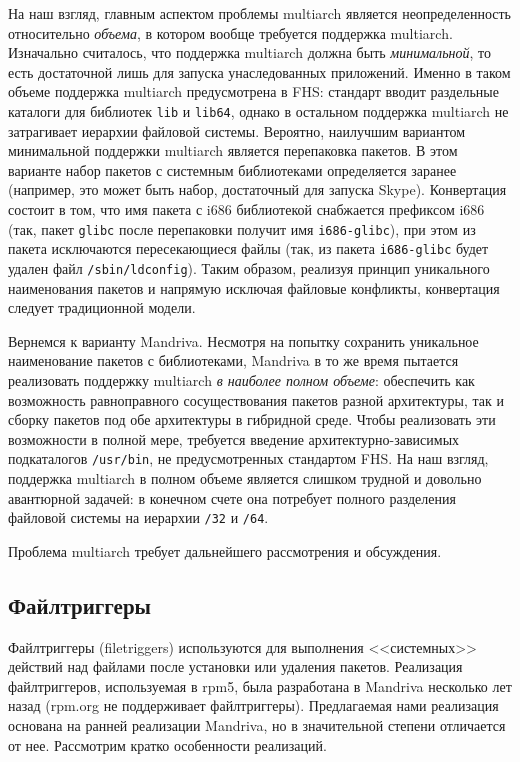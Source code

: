 \documentclass[russian,a4paper,12pt,titlepage]{article}
\begin{document}
На наш взгляд, главным аспектом проблемы multiarch является неопределенность относительно \emph{объема}, в котором
вообще требуется поддержка multiarch.  Изначально считалось, что поддержка multiarch должна быть \emph{минимальной}, то есть
достаточной лишь для запуска унаследованных приложений.  Именно в таком объеме поддержка multiarch предусмотрена в FHS:
стандарт вводит раздельные каталоги для библиотек \verb|lib| и \verb|lib64|, однако в остальном поддержка multiarch не затрагивает
иерархии файловой системы.  Вероятно, наилучшим вариантом минимальной поддержки multiarch является перепаковка пакетов.
В этом варианте набор пакетов с системным библиотеками определяется заранее (например, это может быть набор, достаточный
для запуска Skype).  Конвертация состоит в том, что имя пакета с i686 библиотекой снабжается префиксом i686 (так, пакет
\verb|glibc| после перепаковки получит имя \verb|i686-glibc|), при этом из пакета исключаются пересекающиеся файлы (так,
из пакета \verb|i686-glibc| будет удален файл \verb|/sbin/ldconfig|).  Таким образом, реализуя принцип уникального
наименования пакетов и напрямую исключая файловые конфликты, конвертация следует традиционной модели.

Вернемся к варианту Mandriva.  Несмотря на попытку сохранить уникальное наименование пакетов с библиотеками, Mandriva
в то же время пытается реализовать поддержку multiarch \emph{в наиболее полном объеме}: обеспечить как возможность
равноправного сосуществования пакетов разной архитектуры, так и сборку пакетов под обе архитектуры в гибридной среде.
Чтобы реализовать эти возможности в полной мере, требуется введение архитектурно-зависимых подкаталогов \verb|/usr/bin|,
не предусмотренных стандартом FHS.  На наш взгляд, поддержка multiarch в полном объеме является слишком трудной и довольно
авантюрной задачей: в конечном счете она потребует полного разделения файловой системы на иерархии \verb|/32| и \verb|/64|.

Проблема multiarch требует дальнейшего рассмотрения и обсуждения.

\subsection{Файлтриггеры}
\label{filetriggers}
Файлтриггеры (filetriggers) используются для выполнения <<системных>> действий над файлами после установки или удаления пакетов.
Реализация файлтриггеров, используемая в rpm5, была разработана в Mandriva несколько лет назад (rpm.org не поддерживает файлтриггеры).
Предлагаемая нами реализация основана на ранней реализации Mandriva, но в значительной степени отличается от нее.
Рассмотрим кратко особенности реализаций.
\end{document}
